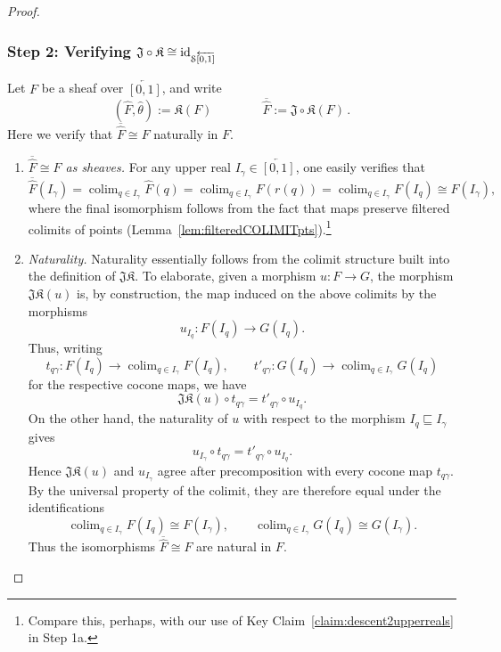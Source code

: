 \documentclass[a4paper, 11pt,reqno]{amsart}
\newcommand{\id}{\mathrm{id}}
\newcommand{\J}{\mathfrak{J}}
\newcommand{\K}{\mathfrak{K}}
\DeclareMathOperator*{\colim}{colim}
\begin{document}
\begin{proof}
	\subsubsection*{Step 2: Verifying $\J\circ\K\cong\id_{\mathcal{S}\protect\overleftarrow{[0,1]}}$}  Let $F$ be a sheaf over $\overleftarrow{[0,1]}$, and write 
	$$(\widehat{F},\widehat{\theta}):=\mathfrak{K}(F)\qquad\qquad \overline{\widehat{F}}:=\mathfrak{J}\circ\mathfrak{K}(F)\,.$$
	\smallskip 
Here we verify that $\overline{\widehat F}\cong F$ naturally in $F$.
	\begin{enumerate}[label=(\alph*)]
		\item \emph{$\overline{\widehat{F}}\cong F$ as sheaves.} For any upper real $I_\gamma\in\overleftarrow{[0,1]}$, one easily verifies that
		\[\overline{\widehat{F}}(I_\gamma)=\displaystyle\colim_{q\in I_\gamma}\widehat{F}(q)=\displaystyle\colim_{q\in I_{\gamma}}F(r(q))=\displaystyle\colim_{q\in I_\gamma}F(I_q)\cong F(I_\gamma),\]
		where the final isomorphism follows from the fact that maps preserve filtered colimits of points (Lemma~\ref{lem:filteredCOLIMITpts}).\footnote{Compare this, perhaps, with our use of Key Claim~\ref{claim:descent2upperreals} in Step 1a.} 
		\item \emph{Naturality.} Naturality essentially follows from the colimit structure built into the definition of $\J\K$. To elaborate, given a morphism $u\colon F\to G$, the morphism $\J\K(u)$ is, by construction,
		the map induced on the above colimits by the morphisms
		\[
		u_{I_q}\colon F(I_q)\longrightarrow G(I_q).
		\]
	Thus, writing
	\[
	t_{q\gamma}\colon F(I_q)\longrightarrow
	\colim_{q\in I_\gamma}F(I_q),
	\qquad
	t'_{q\gamma}\colon G(I_q)\longrightarrow
	\colim_{q\in I_\gamma}G(I_q)
	\]
	for the respective cocone maps, we have
	\[
	\J\K(u)\circ t_{q\gamma}
	=
	t'_{q\gamma}\circ u_{I_q}.
	\]
	On the other hand, the naturality of $u$ with respect to the morphism
	$I_q\sqsubseteq I_\gamma$ gives
	\[
	u_{I_\gamma}\circ t_{q\gamma}
	=
	t'_{q\gamma}\circ u_{I_q}.
	\]
	Hence $\J\K(u)$ and $u_{I_\gamma}$ agree after precomposition with every
	cocone map $t_{q\gamma}$. By the universal property of the colimit, they
	are therefore equal under the identifications
	\[
	\colim_{q\in I_\gamma}F(I_q)\cong F(I_\gamma),
	\qquad
	\colim_{q\in I_\gamma}G(I_q)\cong G(I_\gamma).
	\]
	Thus the isomorphisms
	$\overline{\widehat F}\cong F$ are natural in $F$.	
		

\end{enumerate}
\end{proof}
\end{document}
